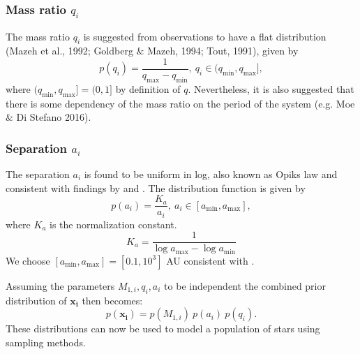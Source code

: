 \documentclass[a4paper,fleqn,usenatbib]{mnras}
\begin{document}
\subsubsection{Mass ratio $q_i$}
%
The mass ratio $q_i$ is suggested from observations to have a flat distribution (Mazeh et al., 1992; Goldberg $\&$ Mazeh, 1994; Tout, 1991),  given by
%
\begin{equation}
    p(q_i) =  \frac{1}{q_{ \text{max}} - q_{ \text{min}}}  , \ q_i \in (q_{ \text{min}}, q_{ \text{max}}],  
	\label{eq:prior-massratio}
\end{equation}
%
where $(q_{ \text{min}}, q_{ \text{max}}] = (0,1]$ by definition of $q$. 
Nevertheless, it is also suggested that there is some dependency of the mass ratio on the period of the
system (e.g. Moe $\&$ Di Stefano 2016).
%
\subsubsection{Separation $a_i$}
The separation $a_i$ is found to be uniform in log, also known as Opiks law \citep{opik1924statistical} and consistent with findings by \citep{kobulnicky2014toward} and \citep{moe2015early}.  The distribution function is given by
%
\begin{equation}
    p(a_i) = \frac{K_a }{a_i},   \ a_i \in [a_{\text{min}} , a_{\text{max}} ],
	\label{eq:prior-separation}
\end{equation} 
%
where $K_a$ is the normalization constant.
%
\begin{equation*}
	K_a = \frac{1}{\log a_{\text{max}}- \log a_{\text{min}}} 	
\end{equation*}
%
We choose $[a_{\text{min}} , a_{\text{max}} ] =  [0.1,10^3]$  AU consistent with \citep{stevenson2017formation}. 





Assuming the parameters $M_{1,i}, q_i, a_i$ to be independent the combined prior distribution of $\mathbf{x_i}$ then becomes:
%
\begin{equation}
	p(\mathbf{x_i}) = p({M_{1,i}}) \ p({a_i}) \  p({q_i}).
	\label{eq:prior-3d}
\end{equation} 
%
These distributions can now be used to model a population of stars using sampling methods. 
%
\end{document}
